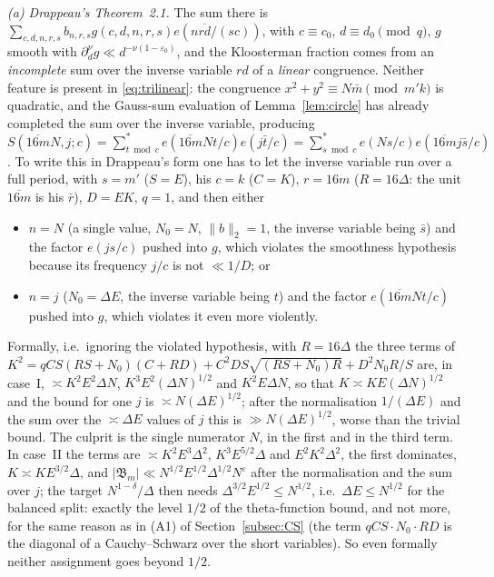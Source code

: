 \documentclass[11pt]{amsart}
\theoremstyle{remark}
\newcommand{\e}{\varepsilon}
\begin{document}
\emph{(a) Drappeau's Theorem~2.1.} The sum there is $\sum_{c,d,n,r,s}b_{n,r,s}g(c,d,n,r,s)e(n\overline{rd}/(sc))$, with $c\equiv c_0$, $d\equiv d_0\pmod q$, $g$ smooth with $\partial_d^\nu g\ll d^{-\nu(1-\e_0)}$, and the Kloosterman fraction comes from an \emph{incomplete} sum over the inverse variable $rd$ of a \emph{linear} congruence. Neither feature is present in \eqref{eq:trilinear}: the congruence $x^2+y^2\equiv N\bar m\pmod{m'k}$ is quadratic, and the Gauss-sum evaluation of Lemma~\ref{lem:circle} has already completed the sum over the inverse variable, producing $S(\overline{16m}N,j;c)=\sum_{t\bmod c}^*e(\overline{16m}Nt/c)e(j\bar t/c)=\sum_{s\bmod c}^*e(Ns/c)e(\overline{16m}j\bar s/c)$. To write this in Drappeau's form one has to let the inverse variable run over a full period, with $s=m'$ ($S=E$), his $c=k$ ($C=K$), $r=16m$ ($R=16\Delta$: the unit $\overline{16m}$ is his $\bar r$), $D=EK$, $q=1$, and then either
\begin{itemize}[leftmargin=1.6em]
\item[I.] $n=N$ (a single value, $N_0=N$, $\|b\|_2=1$, the inverse variable being $\bar s$) and the factor $e(js/c)$ pushed into $g$, which violates the smoothness hypothesis because its frequency $j/c$ is not $\ll1/D$; or
\item[II.] $n=j$ ($N_0=\Delta E$, the inverse variable being $t$) and the factor $e(\overline{16m}Nt/c)$ pushed into $g$, which violates it even more violently.
\end{itemize}
Formally, i.e.\ ignoring the violated hypothesis, with $R=16\Delta$ the three terms of $K^2=qCS(RS+N_0)(C+RD)+C^2DS\sqrt{(RS+N_0)R}+D^2N_0R/S$ are, in case~I, $\asymp K^2E^2\Delta N$, $K^3E^2(\Delta N)^{1/2}$ and $K^2E\Delta N$, so that $K\asymp KE(\Delta N)^{1/2}$ and the bound for one $j$ is $\asymp N(\Delta E)^{1/2}$; after the normalisation $1/(\Delta E)$ and the sum over the $\asymp\Delta E$ values of $j$ this is $\gg N(\Delta E)^{1/2}$, worse than the trivial bound. The culprit is the single numerator $N$, in the first and in the third term. In case~II the terms are $\asymp K^2E^3\Delta^2$, $K^3E^{5/2}\Delta$ and $E^2K^2\Delta^2$, the first dominates, $K\asymp KE^{3/2}\Delta$, and $|\mathfrak B_m|\ll N^{1/2}E^{1/2}\Delta^{1/2}N^{\e}$ after the normalisation and the sum over $j$; the target $N^{1-\delta}/\Delta$ then needs $\Delta^{3/2}E^{1/2}\le N^{1/2}$, i.e.\ $\Delta E\le N^{1/2}$ for the balanced split: exactly the level $1/2$ of the theta-function bound, and not more, for the same reason as in (A1) of Section~\ref{subsec:CS} (the term $qCS\cdot N_0\cdot RD$ is the diagonal of a Cauchy--Schwarz over the short variables). So even formally neither assignment goes beyond $1/2$.
\end{document}
